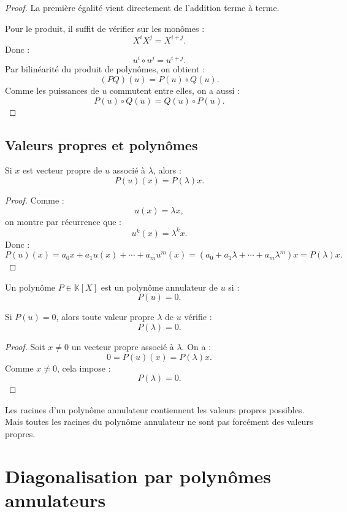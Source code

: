 \documentclass[11pt,a4paper]{article}
\newcommand{\K}{\mathbb K}
\begin{document}
\begin{proof}
La première égalité vient directement de l'addition terme à terme.

Pour le produit, il suffit de vérifier sur les monômes :
\[
X^iX^j=X^{i+j}.
\]
Donc :
\[
u^i\circ u^j=u^{i+j}.
\]
Par bilinéarité du produit de polynômes, on obtient :
\[
(PQ)(u)=P(u)\circ Q(u).
\]
Comme les puissances de \(u\) commutent entre elles, on a aussi :
\[
P(u)\circ Q(u)=Q(u)\circ P(u).
\]
\end{proof}

\subsection{Valeurs propres et polynômes}

\begin{theorembox}
Si \(x\) est vecteur propre de \(u\) associé à \(\lambda\), alors :
\[
P(u)(x)=P(\lambda)x.
\]
\end{theorembox}

\begin{proof}
Comme :
\[
u(x)=\lambda x,
\]
on montre par récurrence que :
\[
u^k(x)=\lambda^k x.
\]
Donc :
\[
P(u)(x)
=
a_0x+a_1u(x)+\cdots+a_mu^m(x)
=
(a_0+a_1\lambda+\cdots+a_m\lambda^m)x
=
P(\lambda)x.
\]
\end{proof}

\begin{definitionbox}
Un polynôme \(P\in\K[X]\) est un polynôme annulateur de \(u\) si :
\[
P(u)=0.
\]
\end{definitionbox}

\begin{theorembox}
Si \(P(u)=0\), alors toute valeur propre \(\lambda\) de \(u\) vérifie :
\[
P(\lambda)=0.
\]
\end{theorembox}

\begin{proof}
Soit \(x\neq0\) un vecteur propre associé à \(\lambda\).  
On a :
\[
0=P(u)(x)=P(\lambda)x.
\]
Comme \(x\neq0\), cela impose :
\[
P(\lambda)=0.
\]
\end{proof}

\begin{erreurbox}
Les racines d'un polynôme annulateur contiennent les valeurs propres possibles.  
Mais toutes les racines du polynôme annulateur ne sont pas forcément des valeurs propres.
\end{erreurbox}

\section{Diagonalisation par polynômes annulateurs}
\end{document}
